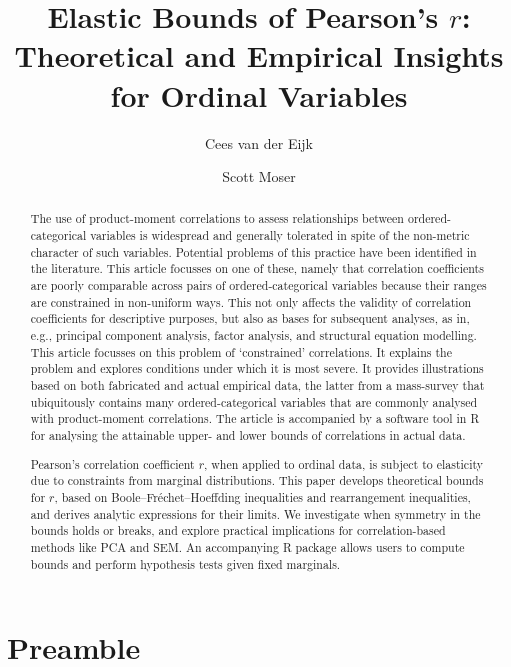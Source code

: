 \documentclass[
  12pt,
]{article}
\title{Elastic Bounds of Pearson's \(r\): Theoretical and Empirical
Insights for Ordinal Variables}
\author{Cees van der Eijk \and Scott Moser}
\date{}
\theoremstyle{plain}
\theoremstyle{definition}
\renewcommand*\contentsname{Table of contents}
\newcommand\contentsname{Table of contents}
\theoremstyle{remark}
\begin{document}
\maketitle

\renewcommand*\contentsname{Table of contents}
{
\hypersetup{linkcolor=}
\setcounter{tocdepth}{3}
\tableofcontents
}

\newpage

\begin{abstract}
The use of product-moment correlations to assess relationships between ordered-categorical variables is widespread and generally tolerated in spite of the non-metric character of such variables. Potential problems of this practice have been identified in the literature. This article focusses on one of these, namely that correlation coefficients are poorly comparable across pairs of ordered-categorical variables because their ranges are constrained in non-uniform ways. This not only affects the validity of correlation coefficients for descriptive purposes, but also as bases for subsequent analyses, as in, e.g., principal component analysis, factor analysis, and structural equation modelling. This article focusses on this problem of ‘constrained’ correlations. It explains the problem and explores conditions under which it is most severe. It provides illustrations based on both fabricated and actual empirical data, the latter from a mass-survey that ubiquitously contains many ordered-categorical variables that are commonly analysed with product-moment correlations. The article is accompanied by a software tool in R for analysing the attainable upper- and lower bounds of correlations in actual data. 

Pearson’s correlation coefficient $r$, when applied to ordinal data, is subject to elasticity due to constraints from marginal distributions. This paper develops theoretical bounds for $r$, based on Boole–Fréchet–Hoeffding inequalities and rearrangement inequalities, and derives analytic expressions for their limits. We investigate when symmetry in the bounds holds or breaks, and explore practical implications for correlation-based methods like PCA and SEM. An accompanying R package allows users to compute bounds and perform hypothesis tests given fixed marginals.
\end{abstract}

\newpage

\section{Preamble}\label{preamble}
\end{document}
